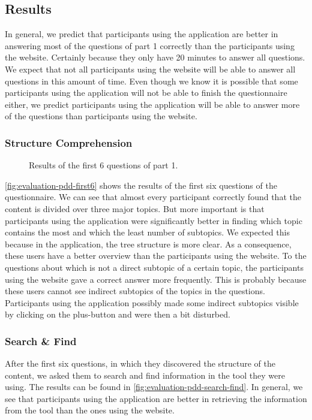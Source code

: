 \subsection{Results}
In general, we predict that participants using the application are better in answering most of the questions of part 1 correctly than the participants using the website. Certainly because they only have 20 minutes to answer all questions. We expect that not all participants using the website will be able to answer all questions in this amount of time. Even though we know it is possible that some participants using the application will not be able to finish the questionnaire either, we predict participants using the application will be able to answer more of the questions than participants using the website.

\subsubsection{Structure Comprehension}

\begin{figure}[H]
	\centering
	\caption{Results of the first 6 questions of part 1.}
	\label{fig:evaluation-pdd-first6}
\end{figure}

\autoref{fig:evaluation-pdd-first6} shows the results of the first six questions of the questionnaire. We can see that almost every participant correctly found that the content is divided over three major topics. But more important is that participants using the application were significantly better in finding which topic contains the most and which the least number of subtopics. We expected this because in the application, the tree structure is more clear. As a consequence, these users have a better overview than the participants using the website. To the questions about which is not a direct subtopic of a certain topic, the participants using the website gave a correct answer more frequently. This is probably because these users cannot see indirect subtopics of the topics in the questions. Participants using the application possibly made some indirect subtopics visible by clicking on the plus-button and were then a bit disturbed.

\subsubsection{Search \& Find}
After the first six questions, in which they discovered the structure of the content, we asked them to search and find information in the tool they were using. The results can be found in \autoref{fig:evaluation-pdd-search-find}. In general, we see that participants using the application are better in retrieving the information from the tool than the ones using the website.

